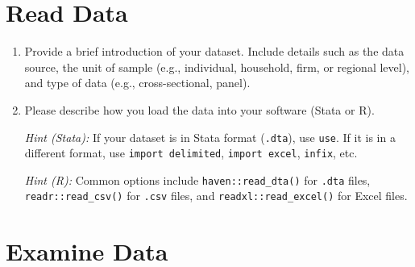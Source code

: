 \documentclass[paper=a4, fontsize=11pt]{scrartcl} %
\begin{document}

\section{Read Data}

\begin{enumerate}
\item Provide a brief introduction of your dataset. Include details such as the data source, the unit of sample (e.g., individual, household, firm, or regional level), and type of data (e.g., cross-sectional, panel).

\item Please describe how you load the data into your software (Stata or R).

\textit{Hint (Stata):} If your dataset is in Stata format (\texttt{.dta}), use \texttt{use}. If it is in a different format, use \texttt{import delimited}, \texttt{import excel}, \texttt{infix}, etc.

\textit{Hint (R):} Common options include \texttt{haven::read\_dta()} for \texttt{.dta} files, \texttt{readr::read\_csv()} for \texttt{.csv} files, and \texttt{readxl::read\_excel()} for Excel files.
\end{enumerate}

\vspace{0.3cm}


\section{Examine Data}
\end{document}

